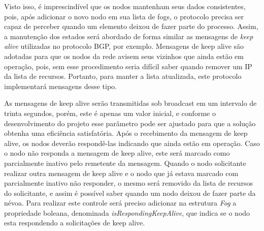Visto isso, é imprescindível que os nodos mantenham seus dados consistentes, pois, após adicionar o novo nodo em sua lista de fogs, o protocolo precisa ser capaz de perceber quando um elemento
deixou de fazer parte do processo. Assim, a manutenção dos estados será abordado de forma similar as mensagens de \textit{keep alive} utilizadas no protocolo BGP, por exemplo.
Mensagens de keep alive são adotadas para que os nodos da rede avisem seus vizinhos que ainda estão em operação, pois, sem esse procedimento seria difícil
saber quando remover um IP da lista de recursos. Portanto, para manter a lista atualizada, este protocolo implementará mensagens desse tipo.

As mensagens de keep alive serão transmitidas sob broadcast em um intervalo de trinta segundos, porém, este é apenas um valor inicial, e conforme o desenvolvimento do projeto esse
parâmetro pode ser ajustado para que a solução obtenha uma eficiência satisfatória.
Após o recebimento da mensagem de keep alive, os nodos deverão respondê-las indicando que ainda estão em operação.
Caso o nodo não responda a mensagem de keep alive, este será marcado como parcialmente inativo pelo remetente da mensagem.
Quando o nodo solicitante realizar outra mensagem de keep alive e o nodo que já estava marcado com parcialmente inativo não responder, o mesmo será removido da lista de recursos do
solicitante, e assim é possível saber quando um nodo deixou de fazer parte da névoa.
Para realizar este controle será preciso adicionar na estrutura \textit{Fog} a propriedade boleana, denominada \textit{isRespondingKeepAlive}, que indica se o nodo esta respondendo a solicitações de keep alive.





